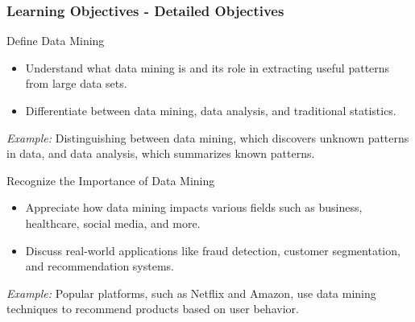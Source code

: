 \documentclass{beamer}
\begin{document}
\begin{frame}[fragile]
    \frametitle{Learning Objectives - Detailed Objectives}
    
    \begin{block}{Define Data Mining}
        \begin{itemize}
            \item Understand what data mining is and its role in extracting useful patterns from large data sets.
            \item Differentiate between data mining, data analysis, and traditional statistics.
        \end{itemize}
        \textit{Example:} Distinguishing between data mining, which discovers unknown patterns in data, and data analysis, which summarizes known patterns.
    \end{block}

    \begin{block}{Recognize the Importance of Data Mining}
        \begin{itemize}
            \item Appreciate how data mining impacts various fields such as business, healthcare, social media, and more.
            \item Discuss real-world applications like fraud detection, customer segmentation, and recommendation systems.
        \end{itemize}
        \textit{Example:} Popular platforms, such as Netflix and Amazon, use data mining techniques to recommend products based on user behavior.
    \end{block}
\end{frame}
\end{document}
